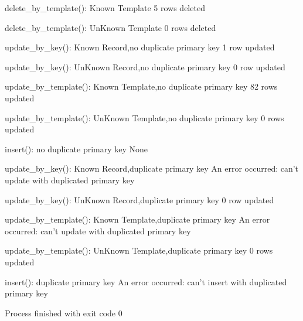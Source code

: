 \documentclass[11pt]{article}
\begin{document}
delete\_by\_template(): Known Template 5 rows deleted

delete\_by\_template(): UnKnown Template 0 rows deleted

update\_by\_key(): Known Record,no duplicate primary key 1 row updated

update\_by\_key(): UnKnown Record,no duplicate primary key 0 row updated

update\_by\_template(): Known Template,no duplicate primary key 82 rows
updated

update\_by\_template(): UnKnown Template,no duplicate primary key 0 rows
updated

insert(): no duplicate primary key None

update\_by\_key(): Known Record,duplicate primary key An error occurred:
can't update with duplicated primary key

update\_by\_key(): UnKnown Record,duplicate primary key 0 row updated

update\_by\_template(): Known Template,duplicate primary key An error
occurred: can't update with duplicated primary key

update\_by\_template(): UnKnown Template,duplicate primary key 0 rows
updated

insert(): duplicate primary key An error occurred: can't insert with
duplicated primary key

Process finished with exit code 0


    
    
    
\end{document}
